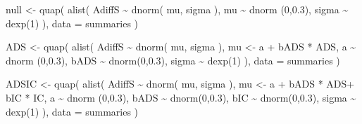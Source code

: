 \documentclass[
  10pt,
  dvipsnames,enabledeprecatedfontcommands]{scrartcl}
\newenvironment{Shaded}{\begin{snugshade}}{\end{snugshade}}
\newcommand{\AttributeTok}[1]{\textcolor[rgb]{0.77,0.63,0.00}{#1}}
\newcommand{\DecValTok}[1]{\textcolor[rgb]{0.00,0.00,0.81}{#1}}
\newcommand{\FloatTok}[1]{\textcolor[rgb]{0.00,0.00,0.81}{#1}}
\newcommand{\FunctionTok}[1]{\textcolor[rgb]{0.00,0.00,0.00}{#1}}
\newcommand{\NormalTok}[1]{#1}
\newcommand{\OtherTok}[1]{\textcolor[rgb]{0.56,0.35,0.01}{#1}}
\newcommand{\SpecialCharTok}[1]{\textcolor[rgb]{0.00,0.00,0.00}{#1}}
\begin{document}
\begin{Shaded}
\begin{Highlighting}[]
\NormalTok{null }\OtherTok{\textless{}{-}} \FunctionTok{quap}\NormalTok{(}
  \FunctionTok{alist}\NormalTok{(}
\NormalTok{    AdiffS }\SpecialCharTok{\textasciitilde{}} \FunctionTok{dnorm}\NormalTok{( mu, sigma ),}
\NormalTok{    mu }\SpecialCharTok{\textasciitilde{}} \FunctionTok{dnorm}\NormalTok{ (}\DecValTok{0}\NormalTok{,}\FloatTok{0.3}\NormalTok{),}
\NormalTok{    sigma  }\SpecialCharTok{\textasciitilde{}} \FunctionTok{dexp}\NormalTok{(}\DecValTok{1}\NormalTok{)}
\NormalTok{  ), }
  \AttributeTok{data =}\NormalTok{ summaries  }
\NormalTok{)}

\NormalTok{ADS }\OtherTok{\textless{}{-}} \FunctionTok{quap}\NormalTok{(}
  \FunctionTok{alist}\NormalTok{(}
\NormalTok{    AdiffS }\SpecialCharTok{\textasciitilde{}} \FunctionTok{dnorm}\NormalTok{( mu, sigma ),}
\NormalTok{    mu }\OtherTok{\textless{}{-}}\NormalTok{  a }\SpecialCharTok{+}\NormalTok{ bADS }\SpecialCharTok{*}\NormalTok{ ADS,}
\NormalTok{    a }\SpecialCharTok{\textasciitilde{}} \FunctionTok{dnorm}\NormalTok{ (}\DecValTok{0}\NormalTok{,}\FloatTok{0.3}\NormalTok{),}
\NormalTok{    bADS }\SpecialCharTok{\textasciitilde{}} \FunctionTok{dnorm}\NormalTok{(}\DecValTok{0}\NormalTok{,}\FloatTok{0.3}\NormalTok{),}
\NormalTok{    sigma  }\SpecialCharTok{\textasciitilde{}} \FunctionTok{dexp}\NormalTok{(}\DecValTok{1}\NormalTok{)}
\NormalTok{  ), }
  \AttributeTok{data =}\NormalTok{ summaries}
\NormalTok{)}

\NormalTok{ADSIC }\OtherTok{\textless{}{-}} \FunctionTok{quap}\NormalTok{(}
  \FunctionTok{alist}\NormalTok{(}
\NormalTok{    AdiffS }\SpecialCharTok{\textasciitilde{}} \FunctionTok{dnorm}\NormalTok{( mu, sigma ),}
\NormalTok{    mu }\OtherTok{\textless{}{-}}\NormalTok{  a }\SpecialCharTok{+}\NormalTok{ bADS }\SpecialCharTok{*}\NormalTok{ ADS}\SpecialCharTok{+}\NormalTok{ bIC }\SpecialCharTok{*}\NormalTok{ IC,}
\NormalTok{    a }\SpecialCharTok{\textasciitilde{}} \FunctionTok{dnorm}\NormalTok{ (}\DecValTok{0}\NormalTok{,}\FloatTok{0.3}\NormalTok{),}
\NormalTok{    bADS }\SpecialCharTok{\textasciitilde{}} \FunctionTok{dnorm}\NormalTok{(}\DecValTok{0}\NormalTok{,}\FloatTok{0.3}\NormalTok{),}
\NormalTok{    bIC }\SpecialCharTok{\textasciitilde{}} \FunctionTok{dnorm}\NormalTok{(}\DecValTok{0}\NormalTok{,}\FloatTok{0.3}\NormalTok{),}
\NormalTok{    sigma  }\SpecialCharTok{\textasciitilde{}} \FunctionTok{dexp}\NormalTok{(}\DecValTok{1}\NormalTok{)}
\NormalTok{  ), }
  \AttributeTok{data =}\NormalTok{ summaries}
\NormalTok{)}



\end{Highlighting}
\end{Shaded}
\end{document}
